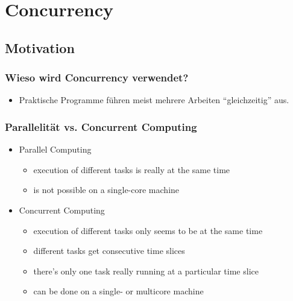 \section{Concurrency}
\subsection{Motivation}
\subsubsection{Wieso wird Concurrency verwendet?}
\begin{itemize}
  \item Praktische Programme führen meist mehrere Arbeiten "`gleichzeitig"' aus. 
\end{itemize}
\subsubsection{Parallelität vs. Concurrent Computing}
\begin{itemize}
  \item Parallel Computing
  	\begin{itemize}
  	  \item execution of different tasks is really at the same time
  	  \item is not possible on a single-core machine 
  	\end{itemize}
  \item Concurrent Computing
  	\begin{itemize}
  	  \item execution of different tasks only seems to be at the same time
  	  \item different tasks get consecutive time slices
  	  \item there's only one task really running at a particular time slice
  	  \item can be done on a single- or multicore machine 
  	\end{itemize} 
\end{itemize}
